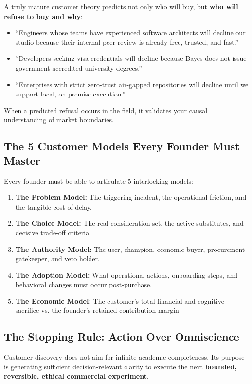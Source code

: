 A truly mature customer theory predicts not only who will buy, but \textbf{who will refuse to buy and why}:
\begin{itemize}[leftmargin=1.2em,itemsep=0.2ex]
  \item ``Engineers whose teams have experienced software architects will decline our studio because their internal peer review is already free, trusted, and fast.''
  \item ``Developers seeking visa credentials will decline because Bayes does not issue government-accredited university degrees.''
  \item ``Enterprises with strict zero-trust air-gapped repositories will decline until we support local, on-premise execution.''
\end{itemize}
When a predicted refusal occurs in the field, it validates your causal understanding of market boundaries.

\subsection{The 5 Customer Models Every Founder Must Master}

Every founder must be able to articulate 5 interlocking models:
\begin{enumerate}[leftmargin=1.2em,itemsep=0.2ex]
  \item \textbf{The Problem Model:} The triggering incident, the operational friction, and the tangible cost of delay.
  \item \textbf{The Choice Model:} The real consideration set, the active substitutes, and decisive trade-off criteria.
  \item \textbf{The Authority Model:} The user, champion, economic buyer, procurement gatekeeper, and veto holder.
  \item \textbf{The Adoption Model:} What operational actions, onboarding steps, and behavioral changes must occur post-purchase.
  \item \textbf{The Economic Model:} The customer's total financial and cognitive sacrifice vs. the founder's retained contribution margin.
\end{enumerate}

\subsection{The Stopping Rule: Action Over Omniscience}

Customer discovery does not aim for infinite academic completeness. Its purpose is generating sufficient decision-relevant clarity to execute the next \textbf{bounded, reversible, ethical commercial experiment}.

